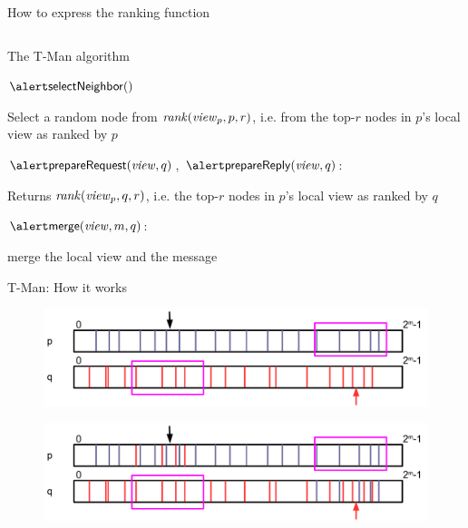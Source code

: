 \begin{frame}{How to express the ranking function}
\begin{columns}
\begin{column}{0.50\textwidth}
\end{column}
\end{columns}

\end{frame}

\begin{frame}{The T-Man algorithm}
	
\BI
\item $\SelectNeighbor()$
\BI
\item Select a random node from $\mathit{rank}(\mathit{view}_p, p, r)$, i.e. from
the top-$r$ nodes in $p$'s local view as ranked by $p$
\EI
\item $\ExtractRequest(\View, q)$, $\ExtractReply(\View, q)$:
\BI
\item Returns $\mathit{rank}(\mathit{view}_p, q, r)$, i.e. the top-$r$ nodes in $p$'s 
local view as ranked by $q$
\EI
\item $\Merge(\View, m, q)$:
\BI
\item merge the local view and the message
\EI
\EI
	
\end{frame}

\begin{frame}{T-Man: How it works}
	
\begin{overprint}
\begin{figure}	
	\includegraphics[width=\textwidth]{figs/11/tman-1}
\end{figure}
\begin{figure}	
	\includegraphics[width=\textwidth]{figs/11/tman-2}
\end{figure}
\end{overprint}

\end{frame}

